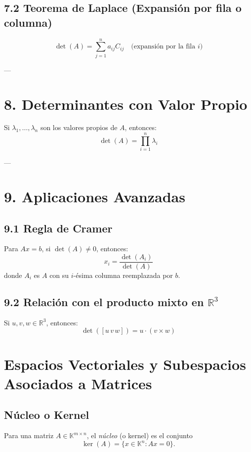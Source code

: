 \documentclass{article}
\begin{document}
\subsection*{7.2 Teorema de Laplace (Expansión por fila o columna)}
\[
\det(A) = \sum_{j=1}^n a_{ij} C_{ij} \quad \text{(expansión por la fila } i)
\]

---

\section*{8. Determinantes con Valor Propio}

Si \( \lambda_1, \dots, \lambda_n \) son los valores propios de \(A\), entonces:
\[
\det(A) = \prod_{i=1}^n \lambda_i
\]

---

\section*{9. Aplicaciones Avanzadas}

\subsection*{9.1 Regla de Cramer}
Para \(Ax = b\), si \( \det(A) \neq 0 \), entonces:
\[
x_i = \frac{\det(A_i)}{\det(A)}
\]
donde \(A_i\) es \(A\) con su \(i\)-ésima columna reemplazada por \(b\).

\subsection*{9.2 Relación con el producto mixto en \(\mathbb{R}^3\)}
Si \( u, v, w \in \mathbb{R}^3 \), entonces:
\[
\det([u\, v\, w]) = u \cdot (v \times w)
\]












\newpage


\section{Espacios Vectoriales y Subespacios Asociados a Matrices}

\subsection{Núcleo o Kernel}
Para una matriz \( A \in \mathbb{K}^{m \times n} \), el \emph{núcleo} (o kernel) es el conjunto
\[
\ker(A) = \{ x \in \mathbb{K}^n : Ax = 0 \}.
\]
\end{document}
